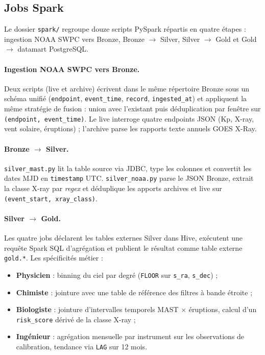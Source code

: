 \documentclass[11pt,a4paper]{article}
\begin{document}
\subsection{Jobs Spark}

Le dossier \texttt{spark/} regroupe douze scripts PySpark répartis en quatre étapes : ingestion NOAA SWPC vers Bronze, Bronze $\rightarrow$ Silver, Silver $\rightarrow$ Gold et Gold $\rightarrow$ datamart PostgreSQL.

\paragraph{Ingestion NOAA SWPC vers Bronze.} Deux scripts (live et archive) écrivent dans le même répertoire Bronze sous un schéma unifié (\texttt{endpoint}, \texttt{event\_time}, \texttt{record}, \texttt{ingested\_at}) et appliquent la même stratégie de fusion : union avec l'existant puis déduplication par fenêtre sur \texttt{(endpoint, event\_time)}. Le live interroge quatre endpoints JSON (Kp, X-ray, vent solaire, éruptions) ; l'archive parse les rapports texte annuels GOES X-Ray.

\paragraph{Bronze $\rightarrow$ Silver.} \texttt{silver\_mast.py} lit la table source via JDBC, type les colonnes et convertit les dates MJD en \texttt{timestamp} UTC. \texttt{silver\_noaa.py} parse le JSON Bronze, extrait la classe X-ray par \textit{regex} et déduplique les apports archives et live sur \texttt{(event\_start, xray\_class)}.

\paragraph{Silver $\rightarrow$ Gold.} Les quatre jobs déclarent les tables externes Silver dans Hive, exécutent une requête Spark SQL d'agrégation et publient le résultat comme table externe \texttt{gold.*}. Les spécificités métier :

\begin{itemize}
    \item \textbf{Physicien} : binning du ciel par degré (\texttt{FLOOR} sur \texttt{s\_ra}, \texttt{s\_dec}) ;
    \item \textbf{Chimiste} : jointure avec une table de référence des filtres à bande étroite ;
    \item \textbf{Biologiste} : jointure d'intervalles temporels MAST $\times$ éruptions, calcul d'un \texttt{risk\_score} dérivé de la classe X-ray ;
    \item \textbf{Ingénieur} : agrégation mensuelle par instrument sur les observations de calibration, tendance via \texttt{LAG} sur 12 mois.
\end{itemize}
\end{document}
